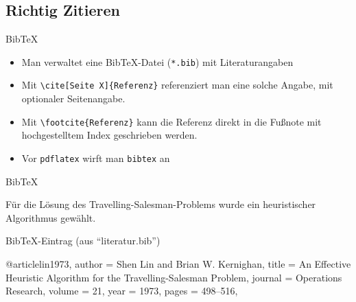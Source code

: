 \documentclass{beamer}
\begin{document}

		\subsection{Richtig Zitieren}

		\begin{frame}[containsverbatim]{Bib\TeX}
			\begin{itemize}
				\item Man verwaltet eine Bib\TeX{}-Datei (\texttt{*.bib}) mit Literaturangaben
				\item Mit \texttt{\textbackslash{}cite[Seite X]\{Referenz\}} referenziert man eine solche Angabe, mit optionaler Seitenangabe.
				\item Mit \texttt{\textbackslash{}footcite\{Referenz\}} kann die Referenz direkt in die Fußnote mit hochgestelltem Index geschrieben werden.
				\item Vor \texttt{pdflatex} wirft man \texttt{bibtex} an
			\end{itemize}
		\end{frame}


		\begin{frame}[containsverbatim]{Bib\TeX}
			\begin{latexcode}


Für die Lösung des Travelling-Salesman-Problems
wurde ein heuristischer Algorithmus \cite{lin19973}
gewählt.


			\end{latexcode}
		\end{frame}


		\begin{frame}[containsverbatim]{Bib\TeX-Eintrag}
			 (aus ``literatur.bib'')
			\begin{latexcode}
@article{lin1973,
	author  = {Shen Lin and Brian W. Kernighan},
	title   = {An Effective Heuristic Algorithm for the
	           Travelling-Salesman Problem},
	journal = {Operations Research},
	volume  = {21},
	year    = {1973},
	pages   = {498--516},
}
			\end{latexcode}
		\end{frame}
\end{document}
